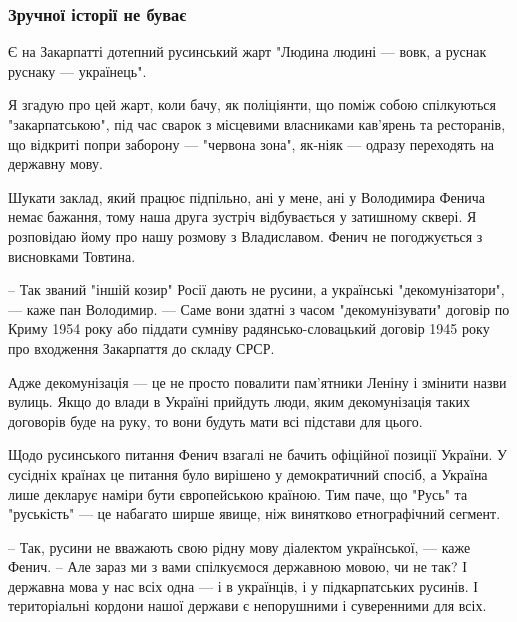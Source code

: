  
 
 

\subsubsection{Зручної історії не буває}
\label{sec:11_11_2020.news.ua.pravda.1.rusynstvo.istoria_zruchna}

Є на Закарпатті дотепний русинський жарт "Людина людині --- вовк, а руснак
руснаку --- українець".

Я згадую про цей жарт, коли бачу, як поліціянти, що поміж собою спілкуються
"закарпатською", під час сварок з місцевими власниками кав’ярень та ресторанів,
що відкриті попри заборону --- "червона зона", як-ніяк --- одразу переходять на
державну мову.

Шукати заклад, який працює підпільно, ані у мене, ані у Володимира Фенича немає
бажання, тому наша друга зустріч відбувається у затишному сквері. Я розповідаю
йому про нашу розмову з Владиславом. Фенич не погоджується з висновками
Товтина.  

– Так званий "іншій козир" Росії дають не русини, а українські
"декомунізатори", --- каже пан Володимир. --- Саме вони здатні з часом
"декомунізувати" договір по Криму 1954 року або піддати сумніву
радянсько-словацький договір 1945 року про входження Закарпаття до складу СРСР.

Адже декомунізація --- це не просто повалити пам’ятники Леніну і змінити назви
вулиць. Якщо до влади в Україні прийдуть люди, яким декомунізація таких
договорів буде на руку, то вони будуть мати всі підстави для цього.

Щодо русинського питання Фенич взагалі не бачить офіційної позиції України. У
сусідніх країнах це питання було вирішено у демократичний спосіб, а Україна
лише декларує наміри бути європейською країною. Тим паче, що "Русь" та
"руськість" --- це набагато ширше явище, ніж винятково етнографічний сегмент.

– Так, русини не вважають свою рідну мову діалектом української, --- каже Фенич.
– Але зараз ми з вами спілкуємося державною мовою, чи не так? І державна мова у
нас всіх одна --- і в українців, і у підкарпатських русинів. І територіальні
кордони нашої держави є непорушними і суверенними для всіх.

